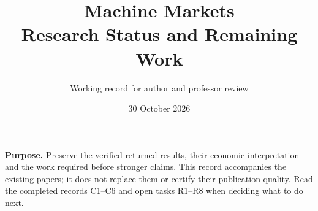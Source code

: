 \documentclass[11pt]{article}
\title{Machine Markets\\Research Status and Remaining Work}
\author{Working record for author and professor review}
\date{30 October 2026}
\begin{document}
\maketitle
\noindent\textbf{Purpose.} Preserve the verified returned results, their economic
interpretation and the work required before stronger claims. This record
accompanies the existing papers; it does not replace them or certify their
publication quality. Read the completed records C1--C6 and open tasks R1--R8
when deciding what to do next.
\tableofcontents


\end{document}
